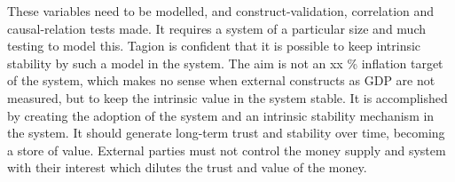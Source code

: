 These variables need to be modelled, and construct-validation, correlation and causal-relation tests made. It requires a system of a particular size and much testing to model this. Tagion is confident that it is possible to keep intrinsic stability by such a model in the system. 
The aim is not an xx \% inflation target of the system, which makes no sense when external constructs as GDP are not measured, but to keep the intrinsic value in the system stable. It is accomplished by creating the adoption of the system and an intrinsic stability mechanism in the system. It should generate long-term trust and stability over time, becoming a store of value. External parties must not control the money supply and system with their interest which dilutes the trust and value of the money. 
